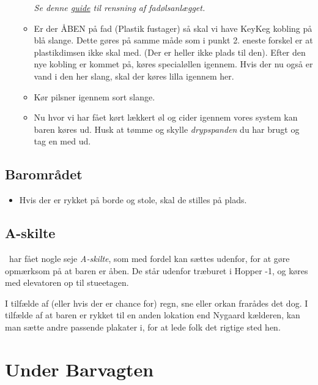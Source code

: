 \begin{itemize}
\begin{itemize}
        \textit{Se denne \href{https://media.fredagscafeen.dk/guides/rensningafanlaeg.pdf}{guide} til rensning af fadølsanlægget.}
        \item Er der ÅBEN på fad (Plastik fustager) så skal vi have KeyKeg kobling på blå slange.
        Dette gøres på samme måde som i punkt 2. eneste forskel er at plastikdimsen ikke skal med.
        (Der er heller ikke plads til den).
        Efter den nye kobling er kommet på, køres specialøllen igennem.
        Hvis der nu også er vand i den her slang, skal der køres lilla igennem her.
        \item Kør pilsner igennem sort slange.
        \item Nu hvor vi har fået kørt lækkert øl og cider igennem vores system kan baren køres ud.
        Husk at tømme og skylle \textit{drypspanden} du har brugt og tag en med ud.
    \end{itemize}
\end{itemize}

\subsection{Barområdet}
\label{sec:pre:baromradet}

\begin{itemize}
    \item Hvis der er rykket på borde og stole, skal de stilles på plads.
\end{itemize}

\subsection{A-skilte}
\label{sec:pre:a-skilte}

\fredagscafeen\ har fået nogle seje \textit{A-skilte},
som med fordel kan sættes udenfor,
for at gøre opmærksom på at baren er åben.
De står udenfor træburet i Hopper -1, og
køres med elevatoren op til stueetagen.

I tilfælde af (eller hvis der er chance for) regn, sne eller orkan
frarådes det dog.
I tilfælde af at baren er rykket til en anden lokation end Nygaard kælderen,
kan man sætte andre passende plakater i, for at lede folk det rigtige sted hen.

\section{Under Barvagten}
\label{sec:intra-barvagten}

